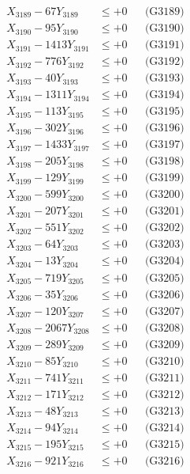 \documentclass[a4paper,10pt]{article}
\begin{document}
{\begin{align}
X_{3189} - 67Y_{3189} &\leq +0 && \text{(G3189)} \\
X_{3190} - 95Y_{3190} &\leq +0 && \text{(G3190)} \\
\allowbreak
X_{3191} - 1413Y_{3191} &\leq +0 && \text{(G3191)} \\
X_{3192} - 776Y_{3192} &\leq +0 && \text{(G3192)} \\
X_{3193} - 40Y_{3193} &\leq +0 && \text{(G3193)} \\
X_{3194} - 1311Y_{3194} &\leq +0 && \text{(G3194)} \\
X_{3195} - 113Y_{3195} &\leq +0 && \text{(G3195)} \\
X_{3196} - 302Y_{3196} &\leq +0 && \text{(G3196)} \\
X_{3197} - 1433Y_{3197} &\leq +0 && \text{(G3197)} \\
X_{3198} - 205Y_{3198} &\leq +0 && \text{(G3198)} \\
X_{3199} - 129Y_{3199} &\leq +0 && \text{(G3199)} \\
X_{3200} - 599Y_{3200} &\leq +0 && \text{(G3200)} \\
\allowbreak
X_{3201} - 207Y_{3201} &\leq +0 && \text{(G3201)} \\
X_{3202} - 551Y_{3202} &\leq +0 && \text{(G3202)} \\
X_{3203} - 64Y_{3203} &\leq +0 && \text{(G3203)} \\
X_{3204} - 13Y_{3204} &\leq +0 && \text{(G3204)} \\
X_{3205} - 719Y_{3205} &\leq +0 && \text{(G3205)} \\
X_{3206} - 35Y_{3206} &\leq +0 && \text{(G3206)} \\
X_{3207} - 120Y_{3207} &\leq +0 && \text{(G3207)} \\
X_{3208} - 2067Y_{3208} &\leq +0 && \text{(G3208)} \\
X_{3209} - 289Y_{3209} &\leq +0 && \text{(G3209)} \\
X_{3210} - 85Y_{3210} &\leq +0 && \text{(G3210)} \\
\allowbreak
X_{3211} - 741Y_{3211} &\leq +0 && \text{(G3211)} \\
X_{3212} - 171Y_{3212} &\leq +0 && \text{(G3212)} \\
X_{3213} - 48Y_{3213} &\leq +0 && \text{(G3213)} \\
X_{3214} - 94Y_{3214} &\leq +0 && \text{(G3214)} \\
X_{3215} - 195Y_{3215} &\leq +0 && \text{(G3215)} \\
X_{3216} - 921Y_{3216} &\leq +0 && \text{(G3216)} \\

\end{align}}
\end{document}
